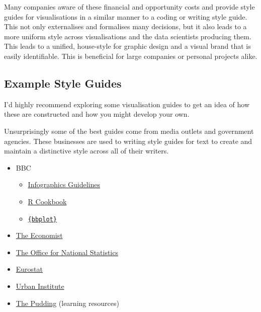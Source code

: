 \documentclass[
  12pt,
]{book}
\providecommand{\tightlist}{%
  \setlength{\itemsep}{0pt}\setlength{\parskip}{0pt}}
\begin{document}
Many companies aware of these financial and opportunity costs and provide style guides for visualisations in a similar manner to a coding or writing style guide. This not only externalises and formalises many decisions, but it also leads to a more uniform style across visualisations and the data scientists producing them. This leads to a unified, house-style for graphic design and a visual brand that is easily identifiable. This is beneficial for large companies or personal projects alike.

\hypertarget{example-style-guides}{%
\subsection{Example Style Guides}\label{example-style-guides}}

I'd highly recommend exploring some visualisation guides to get an idea of how these are constructed and how you might develop your own.

Unsurprisingly some of the best guides come from media outlets and government agencies. These businesses are used to writing style guides for text to create and maintain a distinctive style across all of their writers.

\begin{itemize}
\item
  BBC

  \begin{itemize}
  \tightlist
  \item
    \href{https://www.bbc.co.uk/gel/features/how-to-design-infographics}{Infographics Guidelines}
  \item
    \href{https://bbc.github.io/rcookbook/}{R Cookbook}
  \item
    \href{https://github.com/bbc/bbplot}{\texttt{\{bbplot\}}}
  \end{itemize}
\item
  \href{https://design-system.economist.com/documents/CHARTstyleguide_20170505.pdf}{The Economist}
\item
  \href{https://style.ons.gov.uk/category/data-visualisation/}{The Office for National Statistics}
\item
  \href{https://ec.europa.eu/eurostat/web/products-eurostat-news/-/STYLE-GUIDE_2016}{Eurostat}
\item
  \href{https://urbaninstitute.github.io/graphics-styleguide/}{Urban Institute}
\item
  \href{https://pudding.cool/resources/}{The Pudding} (learning resources)
\end{itemize}
\end{document}
